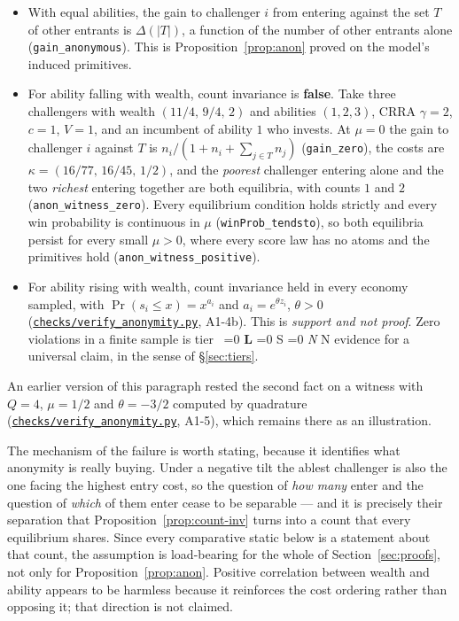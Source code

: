 \documentclass[11pt]{article}
\newcommand{\file}[1]{\href{run:#1}{\texttt{#1}}}
\newcommand{\tier}[1]{%
  \ifnum\pdfstrcmp{#1}{L}=0 \textbf{L}%
  \else\ifnum\pdfstrcmp{#1}{S}=0 S%
  \else\ifnum\pdfstrcmp{#1}{N}=0 \emph{N}%
  \else #1\fi\fi\fi}
\begin{document}
\begin{itemize}
\item With equal abilities, the gain to challenger $i$ from entering against
  the set $T$ of other entrants is $\Delta(|T|)$, a function of the number of
  other entrants alone (\texttt{gain\_anonymous}). This is
  Proposition~\ref{prop:anon} proved on the model's induced primitives.
\item For ability falling with wealth, count invariance is \textbf{false}.
  Take three challengers with wealth $(11/4,\,9/4,\,2)$ and abilities
  $(1,2,3)$, CRRA $\gamma=2$, $c=1$, $V=1$, and an incumbent of ability $1$ who
  invests. At $\mu=0$ the gain to challenger $i$ against $T$ is
  $n_i/(1+n_i+\sum_{j\in T}n_j)$ (\texttt{gain\_zero}), the costs are
  $\kappa=(16/77,\,16/45,\,1/2)$, and the \emph{poorest} challenger entering
  alone and the two \emph{richest} entering together are both equilibria,
  with counts $1$ and $2$ (\texttt{anon\_witness\_zero}). Every equilibrium
  condition holds strictly and every win probability is continuous in $\mu$
  (\texttt{winProb\_tendsto}), so both equilibria persist for every small
  $\mu>0$, where every score law has no atoms and the primitives hold
  (\texttt{anon\_witness\_positive}).
\item For ability rising with wealth, count invariance held in every economy
  sampled, with $\Pr(s_i\le x)=x^{a_i}$ and $a_i=e^{\theta z_i}$, $\theta>0$
  (\file{checks/verify\_anonymity.py}, A1-4b). This is \emph{support and not
  proof}. Zero violations in a finite sample is tier~\tier{N} evidence for a
  universal claim, in the sense of \S\ref{sec:tiers}.
\end{itemize}

An earlier version of this paragraph rested the second fact on a witness with
$Q=4$, $\mu=1/2$ and $\theta=-3/2$ computed by quadrature
(\file{checks/verify\_anonymity.py}, A1-5), which remains there as an
illustration.

The mechanism of the failure is worth stating, because it identifies what
anonymity is really buying. Under a negative tilt the ablest challenger is
also the one facing the highest entry cost, so the question of \emph{how many}
enter and the question of \emph{which} of them enter cease to be separable ---
and it is precisely their separation that Proposition~\ref{prop:count-inv}
turns into a count that every equilibrium shares. Since every comparative
static below is a statement about that count, the assumption is load-bearing
for the whole of Section~\ref{sec:proofs}, not only for
Proposition~\ref{prop:anon}. Positive correlation between wealth and ability
appears to be harmless because it reinforces the cost ordering rather than
opposing it; that direction is not claimed.
\end{document}
